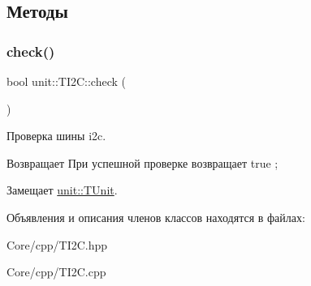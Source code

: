 \subsection{Методы}
\mbox{\label{classunit_1_1_t_i2_c_a9c392b005548ff42ea8bb0b2255f3779}} 
\subsubsection{\texorpdfstring{check()}{check()}}
{\footnotesize\ttfamily bool unit\+::\+T\+I2\+C\+::check (\begin{DoxyParamCaption}{ }\end{DoxyParamCaption})\hspace{0.3cm}{\ttfamily [virtual]}}



Проверка шины i2c. 

\begin{DoxyReturn}{Возвращает}
При успешной проверке возвращает true ; 
\end{DoxyReturn}


Замещает \hyperlink{classunit_1_1_t_unit_abdcc6daabc86cea10abc96593d9d2c2a}{unit\+::\+T\+Unit}.



Объявления и описания членов классов находятся в файлах\+:\begin{DoxyCompactItemize}
\item 
Core/cpp/T\+I2\+C.\+hpp\item 
Core/cpp/T\+I2\+C.\+cpp\end{DoxyCompactItemize}
